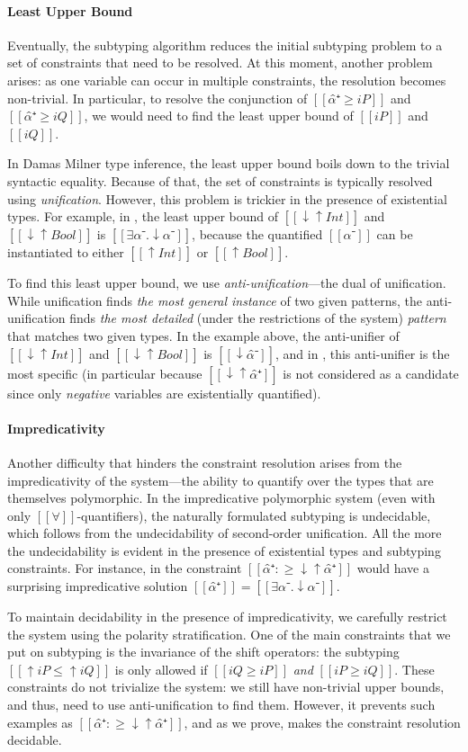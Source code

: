 \paragraph*{Least Upper Bound}
Eventually, the subtyping algorithm reduces the initial subtyping problem to a set of
constraints that need to be resolved. At this moment, another problem arises:
as one variable can occur in multiple constraints, the resolution becomes non-trivial.
In particular, to resolve the conjunction of $[[α̂⁺ ≥ iP]]$ and $[[α̂⁺ ≥ iQ]]$,
we would need to find the least upper bound of $[[iP]]$ and $[[iQ]]$.

In Damas Milner type inference, the least upper bound boils down to the trivial syntactic equality.
Because of that, the set of constraints is typically resolved using \emph{unification}.
However, this problem is trickier in the presence of existential types. For example, 
in \fexists, the least upper bound of $[[↓↑Int]]$ and $[[↓↑Bool]]$ is $[[∃α⁻.↓α⁻]]$,
because the quantified $[[α⁻]]$ can be instantiated to either $[[↑Int]]$ or $[[↑Bool]]$.

To find this least upper bound, we use \emph{anti-unification}---the dual of
unification. While unification finds \emph{the most general instance} of two
given patterns, the anti-unification finds \emph{the most detailed} (under the
restrictions of the system) \emph{pattern} that matches two given types. In the
example above, the anti-unifier of $[[↓↑Int]]$ and $[[↓↑Bool]]$ is $[[↓α̂⁻]]$,
and in \fexists, this anti-unifier is the most specific (in particular because
$[[↓↑α̂⁺]]$ is not considered as a candidate since only \emph{negative} variables are
existentially quantified).

\paragraph*{Impredicativity}
Another difficulty that hinders the constraint resolution arises from the
impredicativity of the system---the ability to quantify over the types that are 
themselves polymorphic. In the impredicative polymorphic system (even
with only $[[∀]]$-quantifiers), the naturally formulated subtyping is
undecidable, which follows from the undecidability of second-order unification.
All the more the undecidability is evident in the presence of existential types
and subtyping constraints. For instance, in \fexists the constraint 
$[[α̂⁺ :≥ ↓↑α̂⁺]]$ would have a surprising impredicative solution $[[α̂⁺]] = [[∃α⁻.↓α⁻]]$. 

To maintain decidability in the presence of impredicativity, we carefully
restrict the system using the polarity stratification. One of the main
constraints that we put on subtyping is the invariance of the shift operators:
the subtyping $[[↑iP ≤ ↑iQ]]$ is only allowed if $[[iQ ≥ iP]]$
\emph{and} $[[iP ≥ iQ]]$. These constraints do not trivialize the system: we
still have non-trivial upper bounds, and thus, need to use anti-unification to
find them. However, it prevents such examples as $[[α̂⁺ :≥ ↓↑α̂⁺]]$, and 
as we prove, makes the constraint resolution decidable.

